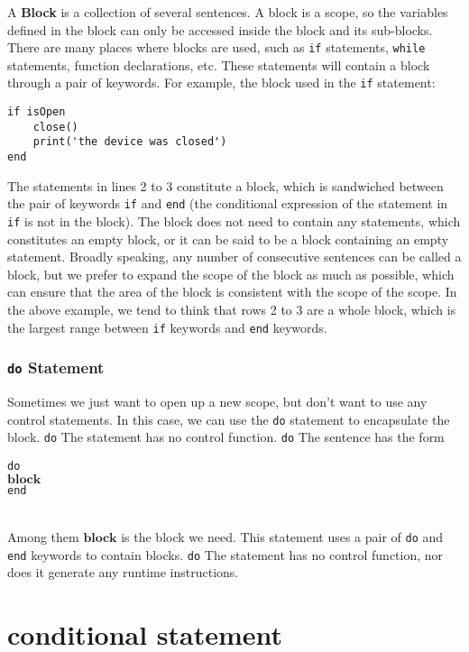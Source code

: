 A \textbf{Block} is a collection of several sentences. A block is a scope, so the variables defined in the block can only be accessed inside the block and its sub-blocks. There are many places where blocks are used, such as \texttt{if} statements, \texttt{while} statements, function declarations, etc. These statements will contain a block through a pair of keywords. For example, the block used in the \texttt{if} statement:
\begin{lstlisting}[language=berry]
if isOpen
    close()
    print('the device was closed')
end
\end{lstlisting}
The statements in lines 2 to 3 constitute a block, which is sandwiched between the pair of keywords \texttt{if} and \texttt{end} (the conditional expression of the statement in \texttt{if} is not in the block). The block does not need to contain any statements, which constitutes an empty block, or it can be said to be a block containing an empty statement. Broadly speaking, any number of consecutive sentences can be called a block, but we prefer to expand the scope of the block as much as possible, which can ensure that the area of   the block is consistent with the scope of the scope. In the above example, we tend to think that rows 2 to 3 are a whole block, which is the largest range between \texttt{if} keywords and \texttt{end} keywords.

\subsubsection {\texttt{do} Statement}Sometimes we just want to open up a new scope, but don't want to use any control statements. In this case, we can use the \texttt{do} statement to encapsulate the block. \texttt{do} The statement has no control function. \texttt{do} The sentence has the form
\begin{algorithm}
    \texttt{do}\\
    \qquad $\bm{block}$ \\
    \texttt{end}
\end{algorithm}\vspace{-0.6em}\\
Among them $\bm{block}$ is the block we need. This statement uses a pair of \texttt{do} and \texttt{end} keywords to contain blocks. \texttt{do} The statement has no control function, nor does it generate any runtime instructions.

\section {conditional statement}


